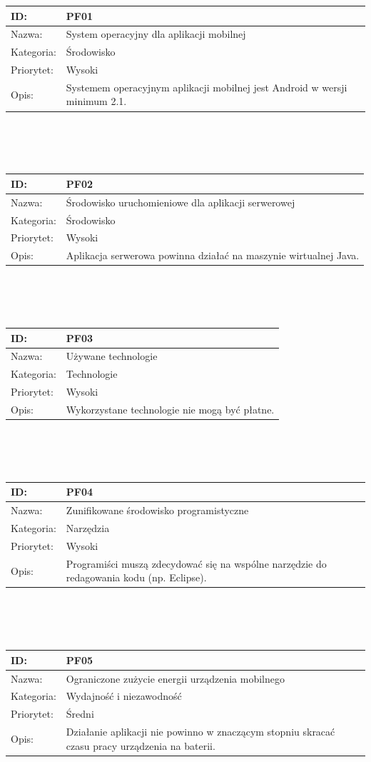 \documentclass[11pt,a4paper,polish,thesis]{dcsbook}
\begin{document}
\begin{tabular}{|p{2cm}|p{12cm}|}  \hline ID: &
PF01
\\ \hline Nazwa: &
System operacyjny dla aplikacji mobilnej	
\\ \hline Kategoria: &
Środowisko
\\ \hline Priorytet: &
Wysoki
\\ \hline Opis: &
Systemem operacyjnym aplikacji mobilnej jest Android w wersji minimum 2.1.

\\ \hline \end{tabular} \\\\\ \begin{tabular}{|p{2cm}|p{12cm}|}  \hline ID: &
PF02
\\ \hline Nazwa: &
Środowisko uruchomieniowe dla aplikacji serwerowej
\\ \hline Kategoria: &
Środowisko
\\ \hline Priorytet: &
Wysoki
\\ \hline Opis: &
Aplikacja serwerowa powinna działać na maszynie wirtualnej Java.

\\ \hline \end{tabular} \\\\\ \begin{tabular}{|p{2cm}|p{12cm}|}  \hline ID: &
PF03
\\ \hline Nazwa: &
Używane technologie
\\ \hline Kategoria: &
Technologie
\\ \hline Priorytet: &
Wysoki
\\ \hline Opis: &
Wykorzystane technologie nie mogą być płatne.

\\ \hline \end{tabular} \\\\\ \begin{tabular}{|p{2cm}|p{12cm}|}  \hline ID: &
PF04
\\ \hline Nazwa: &
Zunifikowane środowisko programistyczne
\\ \hline Kategoria: &
Narzędzia
\\ \hline Priorytet: &
Wysoki
\\ \hline Opis: &
Programiści muszą zdecydować się na wspólne narzędzie do redagowania kodu (np. Eclipse).

\\ \hline \end{tabular} \\\\\ \begin{tabular}{|p{2cm}|p{12cm}|}  \hline ID: &
PF05
\\ \hline Nazwa: &
Ograniczone zużycie energii urządzenia mobilnego
\\ \hline Kategoria: &
Wydajność i niezawodność
\\ \hline Priorytet: &
Średni
\\ \hline Opis: &
Działanie aplikacji nie powinno w znaczącym stopniu skracać czasu pracy urządzenia na baterii.


\end{tabular}
\end{document}
